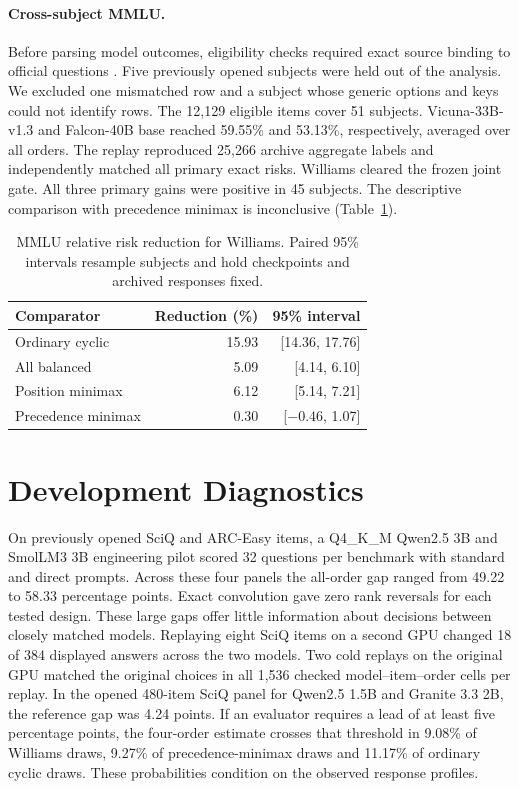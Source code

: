 \paragraph{Cross-subject MMLU.}
Before parsing model outcomes, eligibility checks required exact source
binding to official questions \citep{hendrycks2021}. Five previously
opened subjects were held out of the analysis. We excluded one
mismatched row and a subject whose generic options and keys could not
identify rows. The 12,129 eligible items cover 51 subjects.
Vicuna-33B-v1.3 and Falcon-40B base reached 59.55\% and 53.13\%,
respectively, averaged over all orders. The replay reproduced 25,266
archive aggregate labels and independently matched all primary exact
risks. Williams cleared the frozen joint gate. All three primary
gains were positive in 45 subjects. The descriptive comparison with
precedence minimax is inconclusive (Table~\ref{tab:mmlu}).

\begin{table}[t]
\caption{MMLU relative risk reduction for Williams. Paired 95\%
intervals resample subjects and hold checkpoints and archived
responses fixed.}
\label{tab:mmlu}
\centering
\small
\begin{tabular}{lrr}
\toprule
Comparator & Reduction (\%) & 95\% interval \\
\midrule
Ordinary cyclic & 15.93 & [14.36, 17.76] \\
All balanced & 5.09 & [4.14, 6.10] \\
Position minimax & 6.12 & [5.14, 7.21] \\
Precedence minimax & 0.30 & [$-0.46$, 1.07] \\
\bottomrule
\end{tabular}
\end{table}

\section{Development Diagnostics}
On previously opened SciQ and ARC-Easy items, a Q4\_K\_M Qwen2.5 3B
and SmolLM3 3B engineering pilot scored 32 questions per benchmark
with standard and direct prompts. Across these four panels the
all-order gap ranged from 49.22 to 58.33 percentage points. Exact
convolution gave zero rank reversals for each tested design. These
large gaps offer little information about decisions between closely
matched models. Replaying eight SciQ items on a second GPU changed
18 of 384 displayed answers across the two models. Two cold replays
on the original GPU matched the original choices in all 1,536
checked model--item--order cells per replay. In the opened 480-item
SciQ panel for Qwen2.5 1.5B and Granite 3.3 2B, the reference
gap was 4.24 points. If an evaluator requires a lead of at least
five percentage points, the four-order estimate crosses that
threshold in 9.08\% of Williams draws, 9.27\% of precedence-minimax
draws and 11.17\% of ordinary cyclic draws. These probabilities
condition on the observed response profiles.

